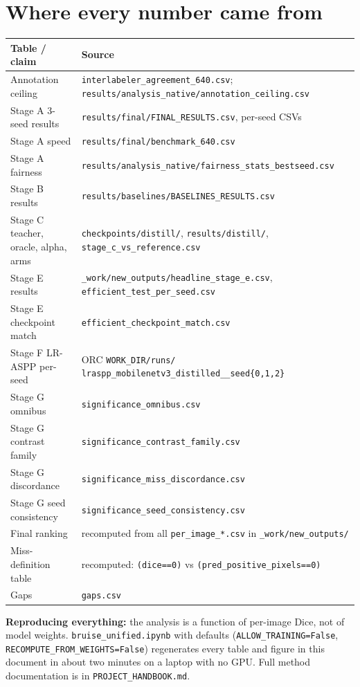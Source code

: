 \documentclass[11pt]{article}
\begin{document}
\appendix
\section{Where every number came from}

\begin{center}
\small
\begin{tabular}{p{4.9cm}>{\raggedright\arraybackslash}p{9.3cm}}
\toprule
\textbf{Table / claim} & \textbf{Source} \\
\midrule
Annotation ceiling & \texttt{interlabeler\_agreement\_640.csv}; \texttt{results/analysis\_native/annotation\_ceiling.csv} \\
Stage A 3-seed results & \texttt{results/final/FINAL\_RESULTS.csv}, per-seed CSVs \\
Stage A speed & \texttt{results/final/benchmark\_640.csv} \\
Stage A fairness & \texttt{results/analysis\_native/fairness\_stats\_bestseed.csv} \\
Stage B results & \texttt{results/baselines/BASELINES\_RESULTS.csv} \\
Stage C teacher, oracle, alpha, arms & \texttt{checkpoints/distill/}, \texttt{results/distill/}, \texttt{stage\_c\_vs\_reference.csv} \\
Stage E results & \texttt{\_work/new\_outputs/headline\_stage\_e.csv}, \texttt{efficient\_test\_per\_seed.csv} \\
Stage E checkpoint match & \texttt{efficient\_checkpoint\_match.csv} \\
Stage F LR-ASPP per-seed & ORC \texttt{WORK\_DIR/runs/} \texttt{lraspp\_mobilenetv3\_distilled\_\_seed\{0,1,2\}} \\
Stage G omnibus & \texttt{significance\_omnibus.csv} \\
Stage G contrast family & \texttt{significance\_contrast\_family.csv} \\
Stage G discordance & \texttt{significance\_miss\_discordance.csv} \\
Stage G seed consistency & \texttt{significance\_seed\_consistency.csv} \\
Final ranking & recomputed from all \texttt{per\_image\_*.csv} in \texttt{\_work/new\_outputs/} \\
Miss-definition table & recomputed: \texttt{(dice==0)} vs \texttt{(pred\_positive\_pixels==0)} \\
Gaps & \texttt{gaps.csv} \\
\bottomrule
\end{tabular}
\end{center}

\vspace{8pt}
\begin{sloppypar}
\noindent\textbf{Reproducing everything:} the analysis is a function of per-image
Dice, not of model weights. \texttt{bruise\_unified.ipynb} with defaults
(\texttt{ALLOW\_TRAINING=False}, \texttt{RECOMPUTE\_FROM\_WEIGHTS=False})
regenerates every table and figure in this document in about two minutes on a
laptop with no GPU. Full method documentation is in
\texttt{PROJECT\_HANDBOOK.md}.
\end{sloppypar}
\end{document}
